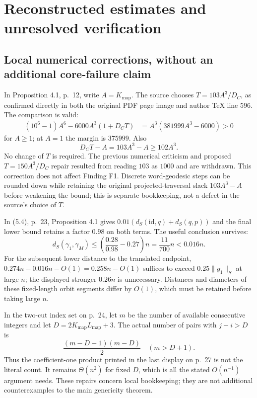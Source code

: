 \documentclass[10pt]{article}
\begin{document}
\section*{Reconstructed estimates and unresolved verification}
\subsection*{Local numerical corrections, without an additional core-failure claim}
In Proposition 4.1, p. 12, write \(A=K_{\mathrm{map}}\). The source chooses \(T=103A^3/D_C\), as confirmed directly in both the original PDF page image and author TeX line 596. The comparison is valid: \[\begin{aligned}
(10^6-1)A^6-6000A^3(1+D_CT)
&=A^3(381999A^3-6000)>0
\end{aligned}\] for \(A\ge1\); at \(A=1\) the margin is \(375999\). Also \[D_CT-A=103A^3-A\ge102A^3.\] No change of \(T\) is required. The previous numerical criticism and proposed \(T=150A^3/D_C\) repair resulted from reading \(103\) as \(1000\) and are withdrawn. This correction does not affect Finding F1. Discrete word-geodesic steps can be rounded down while retaining the original projected-traversal slack \(103A^3-A\) before weakening the bound; this is separate bookkeeping, not a defect in the source’s choice of \(T\).\par
In (5.4), p. 23, Proposition 4.1 gives \(0.01(d_S(\mathrm{id},q)+d_S(q,p))\) and the final lower bound retains a factor \(0.98\) on both terms. The useful conclusion survives: \[d_S(\gamma_1,\gamma_M)
\le\left(\frac{0.28}{0.98}-0.27\right)n
=\frac{11}{700}n<0.016n.\] For the subsequent lower distance to the translated endpoint, \(0.274n-0.016n-O(1)=0.258n-O(1)\) suffices to exceed \(0.25\|g_1\|_S\) at large \(n\); the displayed stronger \(0.26n\) is unnecessary. Distances and diameters of these fixed-length orbit segments differ by \(O(1)\), which must be retained before taking large \(n\).\par
In the two-cut index set on p. 24, let \(m\) be the number of available consecutive integers and let \(D=2K_{\mathrm{map}}L_{\mathrm{map}}+3\). The actual number of pairs with \(j-i>D\) is \[\frac{(m-D-1)(m-D)}2 \quad (m>D+1).\] Thus the coefficient-one product printed in the last display on p. 27 is not the literal count. It remains \(\Theta(n^2)\) for fixed \(D\), which is all the stated \(O(n^{-1})\) argument needs. These repairs concern local bookkeeping; they are not additional counterexamples to the main genericity theorem.\par
\end{document}
